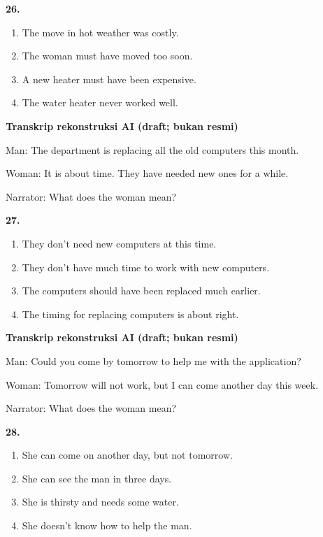 \documentclass[12pt]{article}
\begin{document}
\noindent\textbf{26.}
\begin{enumerate}[label=(\Alph*),leftmargin=*,itemsep=0.2em]
\item The move in hot weather was costly.
\item The woman must have moved too soon.
\item A new heater must have been expensive.
\item The water heater never worked well.
\end{enumerate}
\par
\vspace{0.25\baselineskip}
\begin{exampleblock}
\textbf{Transkrip rekonstruksi AI (draft; bukan resmi)}\par
Man: The department is replacing all the old computers this month.\par
Woman: It is about time. They have needed new ones for a while.\par
Narrator: What does the woman mean?\par
\end{exampleblock}
\noindent\textbf{27.}
\begin{enumerate}[label=(\Alph*),leftmargin=*,itemsep=0.2em]
\item They don't need new computers at this time.
\item They don't have much time to work with new computers.
\item The computers should have been replaced much earlier.
\item The timing for replacing computers is about right.
\end{enumerate}
\par
\vspace{0.25\baselineskip}
\begin{exampleblock}
\textbf{Transkrip rekonstruksi AI (draft; bukan resmi)}\par
Man: Could you come by tomorrow to help me with the application?\par
Woman: Tomorrow will not work, but I can come another day this week.\par
Narrator: What does the woman mean?\par
\end{exampleblock}
\noindent\textbf{28.}
\begin{enumerate}[label=(\Alph*),leftmargin=*,itemsep=0.2em]
\item She can come on another day, but not tomorrow.
\item She can see the man in three days.
\item She is thirsty and needs some water.
\item She doesn't know how to help the man.
\end{enumerate}
\end{document}
